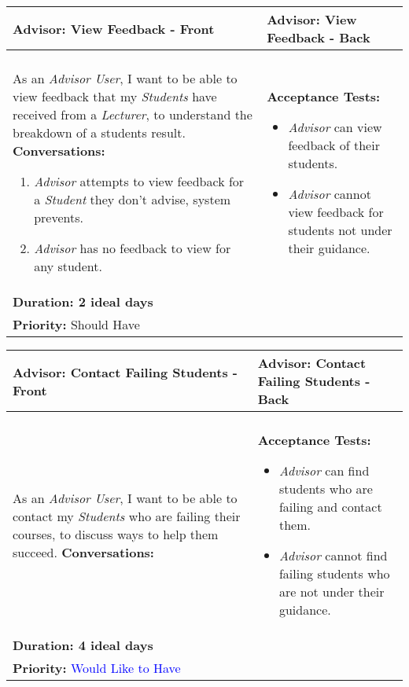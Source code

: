 \documentclass[11pt]{article}
\begin{document}
\begin{center}
\begin{tabular}{ | m{8cm}  |  m{8cm}  | } 
 \hline
 \textbf{Advisor: View Feedback - Front} &  \textbf{Advisor: View Feedback  - Back}  \\ 
  \hline
&\\[5pt]
As an \emph{Advisor User}, I want to be able to view feedback that my \emph{Students} have received from a \emph{Lecturer}, to understand the breakdown of a students result.
\newline
\textbf{Conversations:}
\begin{enumerate}
\item{\emph{Advisor} attempts to view feedback for a \emph{Student} they don't advise, system prevents.}
\item{\emph{Advisor} has no feedback to view for any student.}
\end{enumerate}
& \textbf{Acceptance Tests:} 
\begin{itemize}
\item{\emph{Advisor} can view feedback of their students.}
\item{\emph{Advisor} cannot view feedback for students not under their guidance.} 
\end{itemize} \\
\textbf{Duration: 2 ideal days} &\\
\textbf{Priority:}  \textcolor{mauve}{Should Have} & \\
 \hline
\end{tabular}
\end{center}


\begin{center}
\begin{tabular}{ | m{8cm}  |  m{8cm}  | } 
 \hline
 \textbf{Advisor: Contact Failing Students - Front} &  \textbf{Advisor:  Contact Failing Students   - Back}  \\ 
  \hline
&\\[5pt]
As an \emph{Advisor User}, I want to be able to contact my \emph{Students} who are failing their courses, to discuss ways to help them succeed.\newline
\textbf{Conversations:}
& \textbf{Acceptance Tests:} 
\begin{itemize}
\item{\emph{Advisor} can find students who are failing and contact them.}
\item{\emph{Advisor} cannot find failing students who are not under their guidance.} 
\end{itemize} \\
\textbf{Duration: 4 ideal days} &\\
\textbf{Priority:}  \textcolor{blue}{Would Like to Have} & \\
 \hline
\end{tabular}
\end{center}
\end{document}
